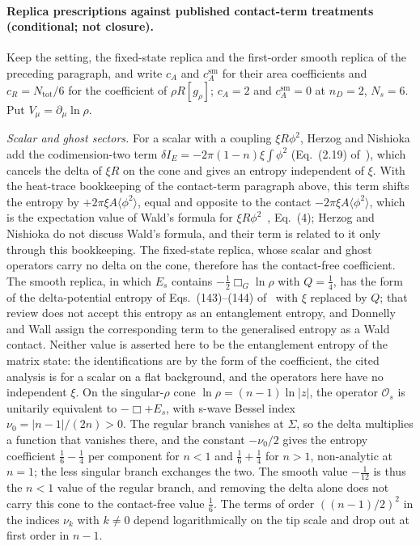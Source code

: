 \paragraph{Replica prescriptions against published contact-term treatments (conditional; not closure).}
Keep the setting, the fixed-state replica and the first-order smooth replica of the preceding paragraph, and write \(c_A\) and \(c_A^{\mathrm{sm}}\) for their area coefficients and \(c_R=N_{\mathrm{tot}}/6\) for the coefficient of \(\rho R[g_\rho]\); \(c_A=2\) and \(c_A^{\mathrm{sm}}=0\) at \(n_D=2\), \(N_s=6\). Put \(V_\mu=\partial_\mu\ln\rho\).

\emph{Scalar and ghost sectors.} For a scalar with a coupling \(\xi R\phi^2\), Herzog and Nishioka add the codimension-two term \(\delta I_E=-2\pi(1-n)\xi\int\phi^2\) (Eq.~(2.19) of~\cite{HerzogNishioka2016}), which cancels the delta of \(\xi R\) on the cone and gives an entropy independent of \(\xi\). With the heat-trace bookkeeping of the contact-term paragraph above, this term shifts the entropy by \(+2\pi\xi A\langle\phi^2\rangle\), equal and opposite to the contact \(-2\pi\xi A\langle\phi^2\rangle\), which is the expectation value of Wald's formula for \(\xi R\phi^2\)~\cite{DonnellyWall2016}, Eq.~(4); Herzog and Nishioka do not discuss Wald's formula, and their term is related to it only through this bookkeeping. The fixed-state replica, whose scalar and ghost operators carry no delta on the cone, therefore has the contact-free coefficient. The smooth replica, in which \(E_s\) contains \(-\tfrac12\Box_G\ln\rho\) with \(Q=\tfrac14\), has the form of the delta-potential entropy of Eqs.~(143)--(144) of~\cite{Solodukhin2011} with \(\xi\) replaced by \(Q\); that review does not accept this entropy as an entanglement entropy, and Donnelly and Wall assign the corresponding term to the generalised entropy as a Wald contact. Neither value is asserted here to be the entanglement entropy of the matrix state: the identifications are by the form of the coefficient, the cited analysis is for a scalar on a flat background, and the operators here have no independent \(\xi\). On the singular-\(\rho\) cone \(\ln\rho=(n-1)\ln|z|\), the operator \(\mathcal O_s\) is unitarily equivalent to \(-\Box+E_s\), with s-wave Bessel index \(\nu_0=|n-1|/(2n)>0\). The regular branch vanishes at \(\Sigma\), so the delta multiplies a function that vanishes there, and the constant \(-\nu_0/2\) gives the entropy coefficient \(\tfrac16-\tfrac14\) per component for \(n<1\) and \(\tfrac16+\tfrac14\) for \(n>1\), non-analytic at \(n=1\); the less singular branch exchanges the two. The smooth value \(-\tfrac1{12}\) is thus the \(n<1\) value of the regular branch, and removing the delta alone does not carry this cone to the contact-free value \(\tfrac16\). The terms of order \(((n-1)/2)^2\) in the indices \(\nu_k\) with \(k\neq0\) depend logarithmically on the tip scale and drop out at first order in \(n-1\).


